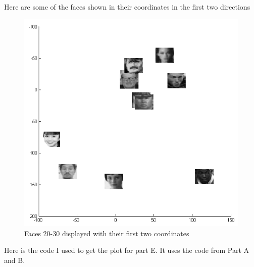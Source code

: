 \documentclass[twoside,11pt]{article}
\theoremstyle{definition}
\begin{document}
Here are some of the faces shown in their coordinates in the first two directions\\
\begin{figure}[h!]
\centering
\includegraphics[width=6 in]{prob3PartE.png}
\caption{Faces 20-30 displayed with their first two coordinates}
\end{figure}
\newpage
Here is the code I used to get the plot for part E. It uses the code from Part A and B.\\

\end{document}
